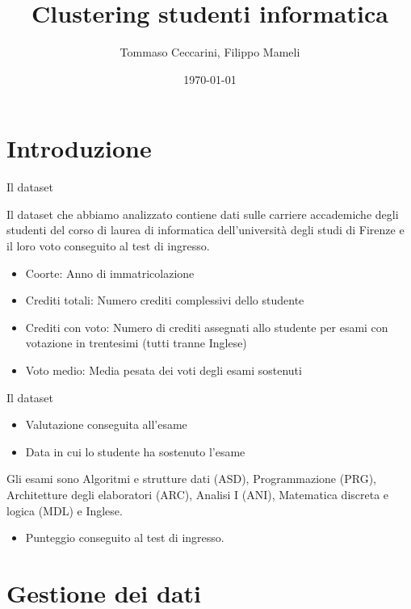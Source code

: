 \documentclass{beamer}
\title{Clustering studenti informatica}
\date{\today}
\author{Tommaso Ceccarini, Filippo Mameli}
\begin{document}
        
    \maketitle

    \section{Introduzione}
    
    \begin{frame}{Il dataset}

        Il dataset che abbiamo analizzato contiene dati sulle carriere accademiche degli studenti del corso di laurea di informatica dell'università degli studi di Firenze e il loro voto conseguito 
        al test di ingresso.
        \begin{itemize}
            \item Coorte: Anno di immatricolazione
            \item Crediti totali: Numero crediti complessivi dello studente
            \item Crediti con voto: Numero di crediti assegnati allo studente per esami con votazione in trentesimi (tutti tranne Inglese)
            \item Voto medio: Media pesata dei voti degli esami sostenuti
        \end{itemize}
    \end{frame}

    \begin{frame}{Il dataset}
        \begin{itemize}
            \item Valutazione conseguita all'esame
            \item Data in cui lo studente ha sostenuto l'esame
        \end{itemize}
        Gli esami sono Algoritmi e strutture dati (ASD), Programmazione (PRG), Architetture degli elaboratori (ARC), Analisi I (ANI), Matematica discreta e logica (MDL) e Inglese.
        \begin{itemize}
            \item Punteggio conseguito al test di ingresso.
        \end{itemize}
    \end{frame}

    \section{Gestione dei dati}
\end{document}
